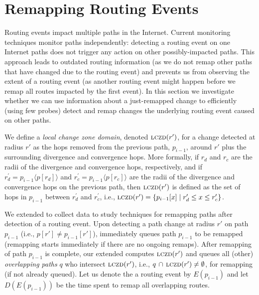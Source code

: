 \section{Remapping Routing Events}
\label{sec:patching}

Routing events impact multiple paths in the Internet. Current
monitoring techniques monitor paths independently: detecting
a routing event on one Internet paths does not trigger any action on
other possibly-impacted paths.  This approach leads to outdated
routing information (as we do not remap other paths that have 
changed due to the routing event) and prevents us from
observing the extent of a routing event (as another routing event
might happen before we remap all routes impacted by the first event).
In this section we investigate whether we can use information about
a just-remapped change to efficiently (using few probes) detect and remap changes the
underlying routing event caused on other paths.  


\newcommand{\lczd}{\ensuremath\mathrm{\textsc{lczd}}}

We define a \emph{local change zone domain}, denoted $\lczd(r')$,
for a change detected at radius $r'$ as the hops removed from the
previous path, $p_{i-1}$, around $r'$ plus the surrounding divergence
and convergence hops. 
More formally, if $r_d$ and
$r_c$ are the radii of the divergence and convergence hops,
respectively, and if $r^\prime_d = p_{i-1}\langle p[r_d]\rangle$ and
$r^\prime_c = p_{i-1}\langle p[r_c]\rangle$ are the radii of the
divergence and convergence hops on the previous path, then
$\lczd(r')$ is defined as the set of hops in $p_{i-1}$ between
$r^\prime_d$ and $r^\prime_c$, i.e., $\lczd(r') = \{p_{i-1}[x]
\mid{} r^\prime_d \le x \le r^\prime_c\}$.

We extended \dtrack{} to collect data to study techniques for remapping paths
after detection of a routing event.  Upon detecting a path change at
radius $r'$ on path $p_{i-1}$ (i.e., $p[r'] \ne p_{i-1}[r']$),
\dtrack{} immediately queues path $p_{i-1}$ to be remapped
(remapping starts immediately if there are no ongoing remaps).
After remapping of path $p_{i-1}$ is complete, our extended \dtrack{} computes
$\lczd(r')$ and queues all (other)
\emph{overlapping paths} $q$ who intersect $\lczd(r')$, i.e., $q\,
\cap\,\lczd(r') \ne \emptyset$, for remapping (if not already queued).
Let us denote the a routing event by $E(p_{i-1})$ 
and let $D(E(p_{i-1}))$ be the time spent to remap all overlapping routes.

